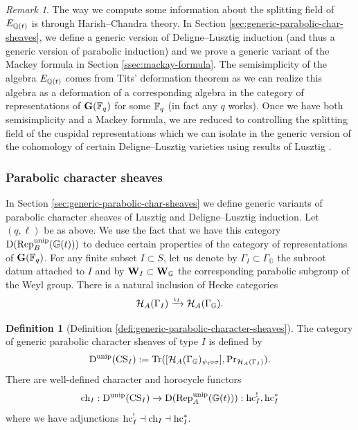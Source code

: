 \documentclass[a4paper, 10pt, oneside, reqno]{amsart}
\theoremstyle{plain}
\theoremstyle{definition}
\newtheorem{defi}[thm]{Definition}
\theoremstyle{remark}
\newtheorem{rque}[thm]{Remark}
\newcommand{\Gbb}{\mathbb{G}}
\newcommand{\Prr}{\mathrm{Pr}}
\begin{document}
\begin{rque}
The way we compute some information about the splitting field of $E_{\mathbb{Q}(t)}$ is through Harish--Chandra theory. In Section \ref{sec:generic-parabolic-char-sheaves}, we define a generic version of Deligne--Lusztig induction (and thus a generic version of parabolic induction) and we prove a generic variant of the Mackey formula in Section \ref{ssec:mackay-formula}. The semisimplicity of the algebra $E_{\mathbb{Q}(t)}$ comes from Tits' deformation theorem as we can realize this algebra as a deformation of a corresponding algebra in the category of representations of $\mathbf{G}(\mathbb{F}_q)$ for some $\mathbb{F}_q$ (in fact any $q$ works). Once we have both semisimplicity and a Mackey formula, we are reduced to controlling the splitting field of the cuspidal representations which we can isolate in the generic version of the cohomology of certain Deligne--Lusztig varieties using results of Lusztig \cite{LusztigCoxeterOrbit, LusztigRationality}. 
\end{rque} 

\subsubsection{Parabolic character sheaves} 

In Section \ref{sec:generic-parabolic-char-sheaves} we define generic variants of parabolic character sheaves of Lusztig \cite{LusztigParabCS} and Deligne--Lusztig induction. Let $(q,\ell)$ be as above. We use the fact that we have this category $\DD(\Rep_{B}^{\unip}(\Gbb(t)))$ to deduce certain properties of the category of representations of $\mathbf{G}(\mathbb{F}_q)$. For any finite subset $I \subset S$, let us denote by $\Gamma_I \subset \Gamma_{\Gbb}$ the subroot datum attached to $I$ and by $\Wbf_I \subset \Wbf_{\Gbb}$ the corresponding parabolic subgroup of the Weyl group. There is a natural inclusion of Hecke categories 
$$\Hcal_A(\Gamma_I) \xrightarrow{\iota_I} \Hcal_A(\Gamma_{\Gbb}).$$

\begin{defi}[Definition \ref{defi:generic-parabolic-character-sheaves}]
The category of generic parabolic character sheaves of type $I$ is defined by 
$$\DD^{\unip}(\CS_I) := \Tr([\Hcal_A(\Gamma_{\Gbb})_{\psi_t \circ \sigma}], \Prr_{\Hcal_A(\Gamma_I)}).$$
There are well-defined character and horocycle functors 
$$\ch_I : \DD^{\unip}(\CS_I) \to \DD(\Rep_A^{\unip}(\Gbb(t))) : \hc_I^!, \hc_I^*$$
where we have adjunctions $\mathrm{hc}_I^! \dashv \mathrm{ch}_I \dashv \mathrm{hc}_I^*$. 
\end{defi} 
\end{document}
